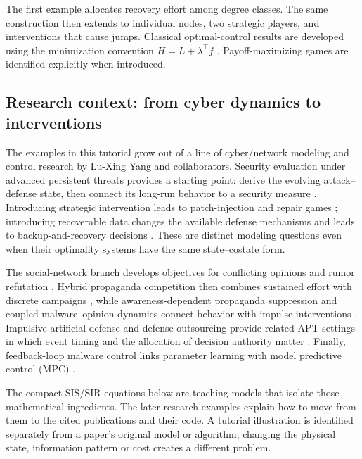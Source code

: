 \documentclass[11pt,a4paper]{article}
\theoremstyle{definition}
\theoremstyle{remark}
\begin{document}
The first example allocates recovery effort among degree classes. The same construction then extends to individual nodes, two strategic players, and interventions that cause jumps. Classical optimal-control results are developed using the minimization convention $H=L+\lambda^\top f$ \cite{pontryagin,liberzon,lenhart}. Payoff-maximizing games are identified explicitly when introduced.


\subsection{Research context: from cyber dynamics to interventions}
The examples in this tutorial grow out of a line of cyber/network modeling and control research by Lu-Xing Yang and collaborators. Security evaluation under advanced persistent threats provides a starting point: derive the evolving attack--defense state, then connect its long-run behavior to a security measure \cite{security2017}. Introducing strategic intervention leads to patch-injection and repair games \cite{patch2018,repair2019}; introducing recoverable data changes the available defense mechanisms and leads to backup-and-recovery decisions \cite{backup2021}. These are distinct modeling questions even when their optimality systems have the same state--costate form.

The social-network branch develops objectives for conflicting opinions and rumor refutation \cite{opinions2020,rumor2021}. Hybrid propaganda competition then combines sustained effort with discrete campaigns \cite{war2024}, while awareness-dependent propaganda suppression and coupled malware--opinion dynamics connect behavior with impulse interventions \cite{awareness2025,malware2025}. Impulsive artificial defense and defense outsourcing provide related APT settings in which event timing and the allocation of decision authority matter \cite{impulse2023,outsource2024}. Finally, feedback-loop malware control links parameter learning with model predictive control (MPC) \cite{feedback2024}.

The compact SIS/SIR equations below are teaching models that isolate those mathematical ingredients. The later research examples explain how to move from them to the cited publications and their code. A tutorial illustration is identified separately from a paper's original model or algorithm; changing the physical state, information pattern or cost creates a different problem.
\end{document}
